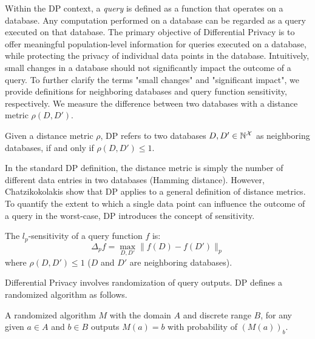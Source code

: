Within the DP context, a \textit{query} is defined as a function that operates on a database. 
Any computation performed on a database can be regarded as a query executed on that database.
The primary objective of Differential Privacy is to offer meaningful population-level information for queries executed on a database, while protecting the privacy of individual data points in the database.
Intuitively, small changes in a database should not significantly impact the outcome of a query.
To further clarify the terms "small changes" and "significant impact", we provide definitions for neighboring databases and query function sensitivity, respectively.
We measure the difference between two databases with a distance metric $\rho(D, D')$.
\begin{definition}
  Given a distance metric $\rho$, DP refers to two databases $D, D' \in \mathbb{N}^\mathcal{X}$ as neighboring databases, if and only if $\rho(D, D') \leq 1$.             
\end{definition}
\noindent In the standard DP definition, the distance metric is simply the number of different data entries in two databases (\ie Hamming distance).
However, Chatzikokolakis \etal \cite{chatzikokolakis2013broadening} show that DP applies to a general definition of distance metrics.
To quantify the extent to which a single data point can influence the outcome of a query in the worst-case, DP introduces the concept of sensitivity. 
\begin{definition}[$l_p$-Sensitivity]
  \label{def:norm-sensitivity}
  The $l_p$-sensitivity of a query function $f$ is:
  \begin{equation*}
    \Delta_p f = \max_{D, D'} \|f(D) - f(D')\|_p 
  \end{equation*}
where $\rho(D, D') \leq 1$ (\ie $D$ and $D'$ are neighboring databases).
\end{definition}
\noindent
Differential Privacy involves randomization of query outputs. DP defines a randomized algorithm as follows.
\begin{definition}
  \label{def:randomized-algorithm}
  A randomized algorithm $M$ with the domain $A$ and discrete range $B$, for any given $a \in A$ and $b \in B$ outputs $M(a)= b$ with probability of $(M(a))_b$.
\end{definition}

